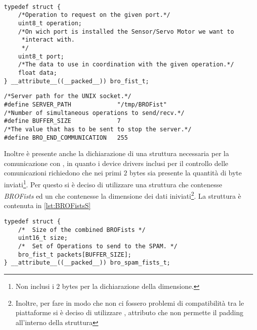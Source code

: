 \begin{figure*}[htbp]
    \begin{lstlisting}[caption=BROFist Structure Declaration,
                       label=lst:BROFistDec]

typedef struct {
    /*Operation to request on the given port.*/
    uint8_t operation;
    /*On wich port is installed the Sensor/Servo Motor we want to
     *interact with.
     */
    uint8_t port;
    /*The data to use in coordination with the given operation.*/
    float data;
} __attribute__((__packed__)) bro_fist_t;

    \end{lstlisting}
\end{figure*}

\begin{figure*}[htbp]
    \begin{lstlisting}[caption=BROFist Server Fundamental Declarations,
                       label=lst:ServerDecs]
/*Server path for the UNIX socket.*/
#define SERVER_PATH             "/tmp/BROFist"
/*Number of simultaneous operations to send/recv.*/
#define BUFFER_SIZE             7
/*The value that has to be sent to stop the server.*/
#define BRO_END_COMMUNICATION   255
    \end{lstlisting}
\end{figure*}

Inoltre è presente anche la dichiarazione di una struttura necessaria per
la comunicazione con \nxtOSEK{}, in quanto i device drivers inclusi per il
controllo delle comunicazioni  richiedono che nei primi
$2$ bytes sia presente la quantità di byte inviati\footnote{Non inclusi i
$2$ bytes per la dichiarazione della dimensione.}. Per questo si è deciso
di utilizzare una struttura che contenesse 
\emph{BROFists} ed un  che contenesse la dimensione
dei dati iniviati\footnote{Inoltre, per fare in modo che non ci fossero
problemi di compatibilità tra le piattaforme si è deciso di utilizzare
, attributo che non permette il
padding all'interno della struttura}. La struttura è contenuta in
\ref{lst:BROFistsS}

\begin{figure*}[htbp]
    \begin{lstlisting}[caption=BROFist Server Fundamental Declarations,
                       label=lst:BROFistsS] 
typedef struct {
    /*  Size of the combined BROFists */
    uint16_t size;
    /*  Set of Operations to send to the SPAM. */
    bro_fist_t packets[BUFFER_SIZE];
} __attribute__((__packed__)) bro_spam_fists_t;
    \end{lstlisting}
\end{figure*}


